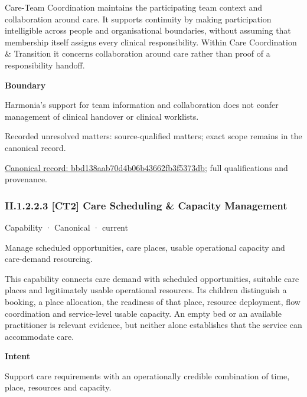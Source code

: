 Care-Team Coordination maintains the participating team context and collaboration around care. It supports continuity by making participation intelligible across people and organisational boundaries, without assuming that membership itself assigns every clinical responsibility. Within Care Coordination \& Transition it concerns collaboration around care rather than proof of a responsibility handoff.



\textbf{Boundary}



Harmonia's support for team information and collaboration does not confer management of clinical handover or clinical worklists.


{\small Recorded unresolved matters: source-qualified matters; exact scope remains in the canonical record.}\par
{\footnotesize \href{../../../../continuum/strategy/capability/bbd138aab70d4b06b43662fb3f5373db.md}{Canonical record: bbd138aab70d4b06b43662fb3f5373db}; full qualifications and provenance.}\par
\subsubsection*{II.1.2.2.3 [CT2] Care Scheduling \& Capacity Management}
\label{navigation:II.1.2.2.3}

\label{element:61dd4b247df14546bf012587164bfe91}
{\small Capability · Canonical · current}\par

Manage scheduled opportunities, care places, usable operational capacity and care-demand resourcing.



This capability connects care demand with scheduled opportunities, suitable care places and legitimately usable operational resources. Its children distinguish a booking, a place allocation, the readiness of that place, resource deployment, flow coordination and service-level usable capacity. An empty bed or an available practitioner is relevant evidence, but neither alone establishes that the service can accommodate care.



\textbf{Intent}



Support care requirements with an operationally credible combination of time, place, resources and capacity.



